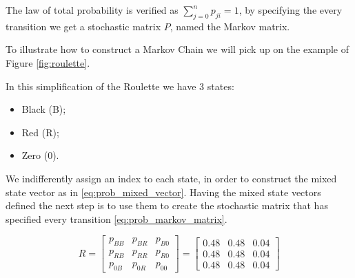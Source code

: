 The law of total probability is verified as $\sum_{j=0}^{n}p_{ji}=1$, by specifying the every transition we get a stochastic matrix $P$, named the Markov matrix.

To illustrate how to construct a Markov Chain we will pick up on the example of Figure \ref{fig:roulette}. 

In this simplification of the Roulette we have $3$ states:
\begin{itemize}
\item Black (B);
\item Red (R);
\item Zero (0).
\end{itemize}

We indifferently assign an index to each state, in order to construct the mixed state vector as in \ref{eq:prob_mixed_vector}. Having the mixed state vectors defined the next step is to use them to create the stochastic matrix that has specified every transition \ref{eq:prob_markov_matrix}.

\begin{equation}
\label{eq:prob_markov_matrix}
R=\left[\begin{array}{ccc}
p_{BB} & p_{BR} & p_{B0}\\
p_{RB} & p_{RR} & p_{R0}\\
p_{0B} & p_{0R} & p_{00}
\end{array}\right] = \left[\begin{array}{ccc}
0.48 & 0.48 & 0.04\\
0.48 & 0.48 & 0.04\\
0.48 & 0.48 & 0.04
\end{array}\right]
\end{equation}

